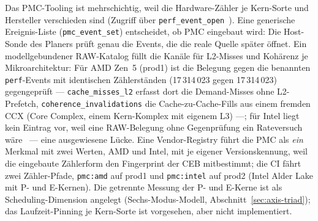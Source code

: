 \begin{nurkurz}
Das PMC-Tooling ist mehrschichtig, weil die Hardware-Zähler je Kern-Sorte und Hersteller verschieden sind
(Zugriff über \texttt{perf\_event\_open}~\cite{linux_perf_event_open}). Eine generische Ereignis-Liste
(\texttt{pmc\_event\_set}) entscheidet, ob PMC eingebaut wird: Die Host-Sonde des Planers prüft genau die
Events, die die reale Quelle später öffnet. Ein modellgebundener RAW-Katalog füllt die Kanäle für
L2-Misses und Kohärenz je Mikroarchitektur: Für AMD Zen~5 (prod1) ist die Belegung gegen die benannten
\texttt{perf}-Events mit identischen Zählerständen (17\,314\,023 gegen 17\,314\,023) gegengeprüft ---
\texttt{cache\_misses\_l2} erfasst dort die Demand-Misses ohne L2-Prefetch,
\texttt{coherence\_invalidations} die Cache-zu-Cache-Fills aus einem fremden CCX (Core Complex, einem
Kern-Komplex mit eigenem L3) ---; für Intel liegt kein Eintrag vor, weil eine RAW-Belegung ohne
Gegenprüfung ein Rateversuch wäre~\cite{intel_sdm} --- eine ausgewiesene Lücke. Eine Vendor-Registry
führt die PMC als \emph{ein} Merkmal mit zwei Werten, AMD und
Intel, mit je eigener Versionskennung, weil die eingebaute Zählerform den Fingerprint der CEB mitbestimmt;
die CI fährt zwei Zähler-Pfade, \texttt{pmc:amd} auf prod1 und \texttt{pmc:intel} auf prod2 (Intel Alder
Lake mit P- und E-Kernen). Die getrennte Messung der P- und E-Kerne ist als Scheduling-Dimension angelegt
(Sechs-Modus-Modell, Abschnitt~\ref{sec:axis-triad}); das Laufzeit-Pinning je Kern-Sorte ist vorgesehen,
aber nicht implementiert.
\end{nurkurz}

